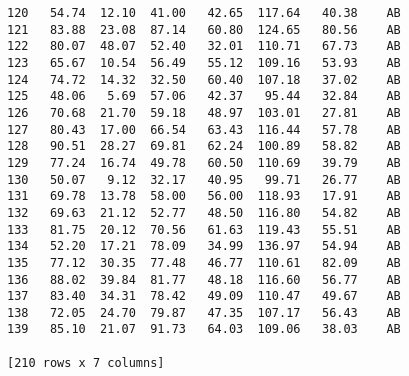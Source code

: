 \documentclass[11pt]{article}
\begin{document}
\begin{Verbatim}[commandchars=\\\{\}]
120   54.74  12.10  41.00   42.65  117.64   40.38    AB
121   83.88  23.08  87.14   60.80  124.65   80.56    AB
122   80.07  48.07  52.40   32.01  110.71   67.73    AB
123   65.67  10.54  56.49   55.12  109.16   53.93    AB
124   74.72  14.32  32.50   60.40  107.18   37.02    AB
125   48.06   5.69  57.06   42.37   95.44   32.84    AB
126   70.68  21.70  59.18   48.97  103.01   27.81    AB
127   80.43  17.00  66.54   63.43  116.44   57.78    AB
128   90.51  28.27  69.81   62.24  100.89   58.82    AB
129   77.24  16.74  49.78   60.50  110.69   39.79    AB
130   50.07   9.12  32.17   40.95   99.71   26.77    AB
131   69.78  13.78  58.00   56.00  118.93   17.91    AB
132   69.63  21.12  52.77   48.50  116.80   54.82    AB
133   81.75  20.12  70.56   61.63  119.43   55.51    AB
134   52.20  17.21  78.09   34.99  136.97   54.94    AB
135   77.12  30.35  77.48   46.77  110.61   82.09    AB
136   88.02  39.84  81.77   48.18  116.60   56.77    AB
137   83.40  34.31  78.42   49.09  110.47   49.67    AB
138   72.05  24.70  79.87   47.35  107.17   56.43    AB
139   85.10  21.07  91.73   64.03  109.06   38.03    AB

[210 rows x 7 columns]

    \end{Verbatim}

    \begin{center}
    \end{center}
    { \hspace*{\fill} \\}
    
\end{document}
